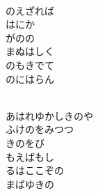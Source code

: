 \documentclass[10pt,b5j]{tarticle} %
\begin{document}
\begin{enumerate}
\begin{minipage}[c]{\blocksize}
    \end{minipage}
    \begin{minipage}[c]{\blocksize}
        
        \vspace{\linespace}
        \item~\\
        のえざれば\\
        はにか\\
        がのの\\
        まぬはしく\\
        のもきでて\\
        のにはらん
        
    \end{minipage}
    \begin{minipage}[c]{\blocksize}
        
        \vspace{\linespace}
        \item~\\
        あはれゆかしきのや\\
        ふけのをみつつ\\
        きのをび\\
        もえばもし\\
        るはここぞの\\
        まばゆきの
    
    \end{minipage}
\end{enumerate} %
\end{document}
